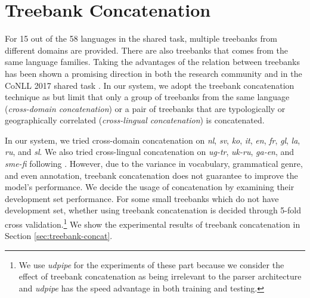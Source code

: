 \documentclass[11pt,a4paper]{article}
\begin{document}
\section{Treebank Concatenation}\label{sec:comb}

For 15 out of the 58 languages in the shared task,
multiple treebanks from different domains are provided.
There are also treebanks that comes from the same language families.
Taking the advantages of the relation between treebanks has been shown 
a promising direction in both the research community \cite{TACL892,guo-EtAl:2015:ACL-IJCNLP2,C16-1002}
and in the CoNLL 2017 shared task \cite{che-EtAl:2017:K17-3,bjorkelund-EtAl:2017:K17-3,shi-EtAl:2017:K17-3}.
In our system, we adopt the treebank concatenation technique as \cite{TACL892}
but limit that only a group of treebanks from the same language (\textit{cross-domain concatenation})
or a pair of treebanks that are typologically or geographically correlated (\textit{cross-lingual concatenation})
is concatenated.

In our system, we tried cross-domain concatenation on
\textit{nl}, \textit{sv}, \textit{ko}, \textit{it}, \textit{en}, \textit{fr},
\textit{gl}, \textit{la}, \textit{ru}, and \textit{sl}.
We also tried cross-lingual concatenation on \textit{ug-tr}, \textit{uk-ru}, \textit{ga-en},
and \textit{sme-fi} following \cite{che-EtAl:2017:K17-3}.
However, due to the variance in vocabulary, grammatical genre, and even annotation, 
treebank concatenation does not guarantee to improve the model's performance.
We decide the usage of concatenation by examining their development set performance.
For some small treebanks which do not have development set, whether using treebank concatenation
is decided through 5-fold cross validation.\footnote{We use \textit{udpipe} \citep{udpipe} 
	for the experiments of these part
	because we consider the effect of treebank concatenation as
	being irrelevant to the parser architecture
	and \textit{udpipe} has the speed advantage in both training and testing.}
We show the experimental results of treebank concatenation
in Section \ref{sec:treebank-concat}.

%
%


%
%
\end{document}
